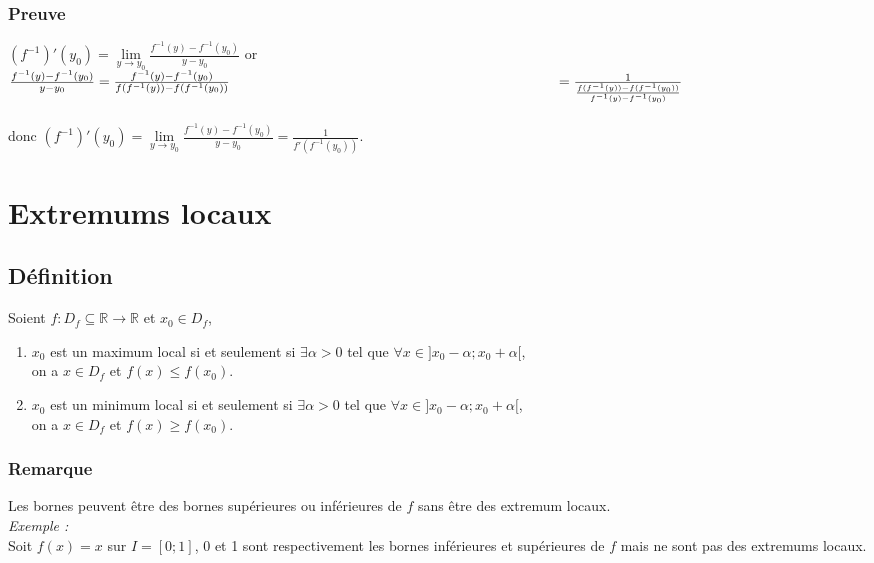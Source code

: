 \documentclass[a4paper,10pt]{book} %
\newcommand{\R}{\mathbb{R}}
\begin{document}
\subsubsection{Preuve}
$(f^{-1})'(y_{0})=\lim\limits_{y \rightarrow y_{0}}\frac{f^{-1}(y)-f^{-1}(y_{0})}{y-y_{0}}$ or $\frac{f^{-1}(y)-f^{-1}(y_{0})}{y-y_{0}}=\frac{f^{-1}(y)-f^{-1}(y_{0})}{f(f^{-1}(y))-f(f^{-1}(y_{0}))}\\
\hspace*{8.2cm}=\frac{1}{\frac{f(f^{-1}(y))-f(f^{-1}(y_{0}))}{f^{-1}(y)-f^{-1}(y_{0})}}$\\\\

donc $(f^{-1})'(y_{0})=\lim\limits_{y \rightarrow y_{0}} \frac{f^{-1}(y)-f^{-1}(y_{0})}{y-y_{0}}=\frac{1}{f'(f^{-1}(y_{0}))}$.

\newpage

\section{Extremums locaux}
\subsection{Définition}
Soient $f : D_{f} \subseteq \R \rightarrow \R$ et $x_{0}\in D_f$,
\begin{enumerate}
\item $x_{0}$ est un maximum local si et seulement si $\exists \alpha>0$ tel que $\forall x\in ]x_{0}-\alpha;x_{0}+\alpha[$,\\
on a $x\in D_f$ et $f(x)\leq f(x_0)$.

\item $x_{0}$ est un minimum local si et seulement si $\exists \alpha>0$ tel que $\forall x\in ]x_{0}-\alpha;x_{0}+\alpha[$,\\
on a $x\in D_f$ et $f(x)\geq f(x_0)$.
\end{enumerate}

\subsubsection{Remarque}
Les bornes peuvent être des bornes supérieures ou inférieures de $f$ sans être des extremum locaux.\\

\emph{Exemple :}\\
Soit $f(x)=x$ sur $I=[0;1]$, 0 et 1 sont respectivement les bornes inférieures et supérieures de $f$ mais ne sont pas des extremums locaux.
\end{document}
